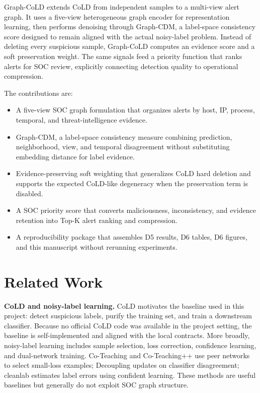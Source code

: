 \documentclass[11pt]{article}
\begin{document}
Graph-CoLD extends CoLD from independent samples to a multi-view alert graph. It uses a five-view heterogeneous graph encoder for representation learning, then performs denoising through Graph-CDM, a label-space consistency score designed to remain aligned with the actual noisy-label problem. Instead of deleting every suspicious sample, Graph-CoLD computes an evidence score and a soft preservation weight. The same signals feed a priority function that ranks alerts for SOC review, explicitly connecting detection quality to operational compression.

The contributions are:
\begin{itemize}
    \item A five-view SOC graph formulation that organizes alerts by host, IP, process, temporal, and threat-intelligence evidence.
    \item Graph-CDM, a label-space consistency measure combining prediction, neighborhood, view, and temporal disagreement without substituting embedding distance for label evidence.
    \item Evidence-preserving soft weighting that generalizes CoLD hard deletion and supports the expected CoLD-like degeneracy when the preservation term is disabled.
    \item A SOC priority score that converts maliciousness, inconsistency, and evidence retention into Top-K alert ranking and compression.
    \item A reproducibility package that assembles D5 results, D6 tables, D6 figures, and this manuscript without rerunning experiments.
\end{itemize}

\section{Related Work}
\textbf{CoLD and noisy-label learning.}
CoLD motivates the baseline used in this project: detect suspicious labels, purify the training set, and train a downstream classifier. Because no official CoLD code was available in the project setting, the baseline is self-implemented and aligned with the local contracts. More broadly, noisy-label learning includes sample selection, loss correction, confidence learning, and dual-network training. Co-Teaching and Co-Teaching++ use peer networks to select small-loss examples; Decoupling updates on classifier disagreement; cleanlab estimates label errors using confident learning. These methods are useful baselines but generally do not exploit SOC graph structure.
\end{document}
